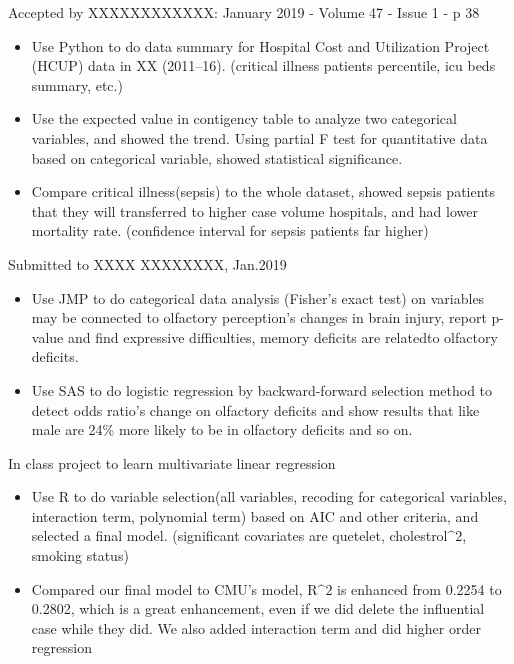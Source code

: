 \documentclass{resume}
\begin{document}
Accepted by XXXXXXXXXXXX: January 2019 - Volume 47 - Issue 1 - p 38
\begin{itemize}
  \item Use Python to do data summary for Hospital Cost and Utilization Project (HCUP) data in XX (2011–16). (critical illness patients percentile, icu beds summary, etc.)
  \item Use the expected value in contigency table to analyze two categorical variables, and showed the trend. Using partial F test for quantitative data based on categorical variable, showed statistical significance.
  \item Compare critical illness(sepsis) to the whole dataset, showed sepsis patients that they will transferred to higher case volume hospitals, and had lower mortality rate. (confidence interval for sepsis patients far higher)
\end{itemize}

Submitted to XXXX XXXXXXXX, Jan.2019
\begin{itemize}
  \item Use JMP to do categorical data analysis (Fisher's exact test) on variables may be connected to olfactory perception's changes in brain injury, report p-value and find expressive difficulties, memory deficits are relatedto olfactory deficits.
  \item Use SAS to do logistic regression by backward-forward selection method to detect odds ratio's change on olfactory deficits and show results that like male are 24\% more likely to be in olfactory deficits and so on.
\end{itemize}

In class project to learn multivariate linear regression
\begin{itemize}
  \item Use R to do variable selection(all variables, recoding for categorical variables, interaction term, polynomial term) based on AIC and other criteria, and selected a final model. (significant covariates are quetelet, cholestrol$\^{2}$, smoking status)
  \item Compared our final model to CMU's model, R$\^{2}$ is enhanced from 0.2254 to 0.2802, which is a great enhancement,
even if we did delete the influential case while they did. We also added interaction term and did higher order regression
\end{itemize}
\end{document}
